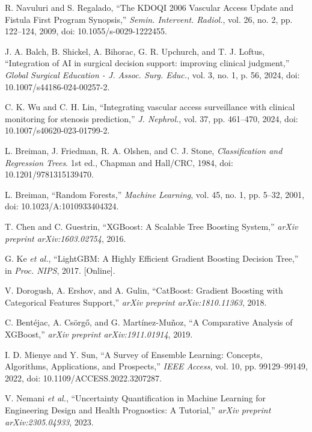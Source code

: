 \documentclass{ieeeaccess}
\begin{document}
\begin{thebibliography}{1}

R. Navuluri and S. Regalado, ``The KDOQI 2006 Vascular Access Update and Fistula First Program Synopsis,'' \emph{Semin. Intervent. Radiol.}, vol. 26, no. 2, pp. 122--124, 2009, doi: 10.1055/s-0029-1222455.

J. A. Balch, B. Shickel, A. Bihorac, G. R. Upchurch, and T. J. Loftus, ``Integration of AI in surgical decision support: improving clinical judgment,'' \emph{Global Surgical Education - J. Assoc. Surg. Educ.}, vol. 3, no. 1, p. 56, 2024, doi: 10.1007/s44186-024-00257-2.

C. K. Wu and C. H. Lin, ``Integrating vascular access surveillance with clinical monitoring for stenosis prediction,'' \emph{J. Nephrol.}, vol. 37, pp. 461--470, 2024, doi: 10.1007/s40620-023-01799-2.

L. Breiman, J. Friedman, R. A. Olshen, and C. J. Stone, \emph{Classification and Regression Trees}. 1st ed., Chapman and Hall/CRC, 1984, doi: 10.1201/9781315139470.

L. Breiman, ``Random Forests,'' \emph{Machine Learning}, vol. 45, no. 1, pp. 5--32, 2001, doi: 10.1023/A:1010933404324.

T. Chen and C. Guestrin, ``XGBoost: A Scalable Tree Boosting System,'' \emph{arXiv preprint arXiv:1603.02754}, 2016.

G. Ke \emph{et al.}, ``LightGBM: A Highly Efficient Gradient Boosting Decision Tree,'' in \emph{Proc. NIPS}, 2017. [Online].

V. Dorogush, A. Ershov, and A. Gulin, ``CatBoost: Gradient Boosting with Categorical Features Support,'' \emph{arXiv preprint arXiv:1810.11363}, 2018.

C. Bentéjac, A. Csörgő, and G. Martínez-Muñoz, ``A Comparative Analysis of XGBoost,'' \emph{arXiv preprint arXiv:1911.01914}, 2019.

I. D. Mienye and Y. Sun, ``A Survey of Ensemble Learning: Concepts, Algorithms, Applications, and Prospects,'' \emph{IEEE Access}, vol. 10, pp. 99129--99149, 2022, doi: 10.1109/ACCESS.2022.3207287.

V. Nemani \emph{et al.}, ``Uncertainty Quantification in Machine Learning for Engineering Design and Health Prognostics: A Tutorial,'' \emph{arXiv preprint arXiv:2305.04933}, 2023.


\end{thebibliography}
\end{document}
